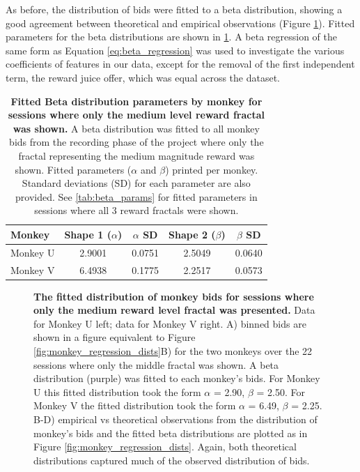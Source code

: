 As before, the distribution of bids were fitted to a beta distribution, showing a good agreement between theoretical and empirical observations (Figure \ref{fig:single_fractal_beta_fit}). Fitted parameters for the beta distributions are shown in \ref{tab:beta_params2}. A beta regression of the same form as Equation \ref{eq:beta_regression} was used to investigate the various coefficients of features in our data, except for the removal of the first independent term, the reward juice offer, which was equal across the dataset.

\begin{table}[htbp]
    \centering
    \begin{tabular}{lcccc}
        \hline
        \textbf{Monkey} & \textbf{Shape 1 ($\alpha$)} & \textbf{$\alpha$ SD} & \textbf{Shape 2 ($\beta$)} & \textbf{$\beta$ SD} \\
        \hline
        Monkey U & 2.9001 & 0.0751 & 2.5049 & 0.0640 \\
        Monkey V & 6.4938 & 0.1775 & 2.2517 & 0.0573 \\
        \hline
    \end{tabular}
\caption[Fitted Beta distribution parameters by monkey for sessions where only the medium level reward fractal was shown.]{\textbf{Fitted Beta distribution parameters by monkey for sessions where only the medium level reward fractal was shown.} A beta distribution was fitted to all monkey bids from the recording phase of the project where only the fractal representing the medium magnitude reward was shown. Fitted parameters ($\alpha$ and $\beta$)  printed per monkey. Standard deviations (SD) for each parameter are also provided. See \ref{tab:beta_params} for fitted parameters in sessions where all 3 reward fractals were shown.}
    \label{tab:beta_params2}
\end{table}

\begin{figure}[htbp!] 
\centering    

\caption[The fitted distribution of monkey bids for sessions where only the medium reward level fractal was presented.]{\textbf{The fitted distribution of monkey bids for sessions where only the medium reward level fractal was presented.} Data for Monkey U left; data for Monkey V right. A) binned bids are shown in a figure equivalent to Figure \ref{fig:monkey_regression_dists}B) for the two monkeys over the 22 sessions where only the middle fractal was shown. A beta distribution (purple) was fitted to each monkey’s bids. For Monkey U this fitted distribution took the form $\alpha$ = 2.90, $\beta$ = 2.50. For Monkey V the fitted distribution took the form $\alpha$ = 6.49, $\beta$ = 2.25. B-D) empirical vs theoretical observations from the distribution of monkey’s bids and the fitted beta distributions are plotted as in Figure \ref{fig:monkey_regression_dists}. Again, both theoretical distributions captured much of the observed distribution of bids.}
\label{fig:single_fractal_beta_fit}
\end{figure}

